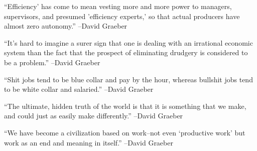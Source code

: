 \documentclass{article}%
\begin{document}
\linebreak%
\vspace{1mm}%
\begin{minipage}{\textwidth}%
\flushleft%
“Efficiency' has come to mean vesting more and more power to managers, supervisors, and presumed 'efficiency experts,' so that actual producers have almost zero autonomy.”%
\linebreak%
\vspace{1mm}%
–David Graeber%
\linebreak%
\vspace{1mm}%
\end{minipage}%
\linebreak%
\vspace{1mm}%
\begin{minipage}{\textwidth}%
\flushleft%
“It's hard to imagine a surer sign that one is dealing with an irrational economic system than the fact that the prospect of eliminating drudgery is considered to be a problem.”%
\linebreak%
\vspace{1mm}%
–David Graeber%
\linebreak%
\vspace{1mm}%
\end{minipage}%
\linebreak%
\vspace{1mm}%
\begin{minipage}{\textwidth}%
\flushleft%
“Shit jobs tend to be blue collar and pay by the hour, whereas bullshit jobs tend to be white collar and salaried.”%
\linebreak%
\vspace{1mm}%
–David Graeber%
\linebreak%
\vspace{1mm}%
\end{minipage}%
\linebreak%
\vspace{1mm}%
\begin{minipage}{\textwidth}%
\flushleft%
“The ultimate, hidden truth of the world is that it is something that we make, and could just as easily make differently.”%
\linebreak%
\vspace{1mm}%
–David Graeber%
\linebreak%
\vspace{1mm}%
\end{minipage}%
\linebreak%
\vspace{1mm}%
\begin{minipage}{\textwidth}%
\flushleft%
“We have become a civilization based on work–not even ‘productive work’ but work as an end and meaning in itself.”%
\linebreak%
\vspace{1mm}%
–David Graeber%
\linebreak%
\vspace{1mm}%
\end{minipage}%
\end{document}
